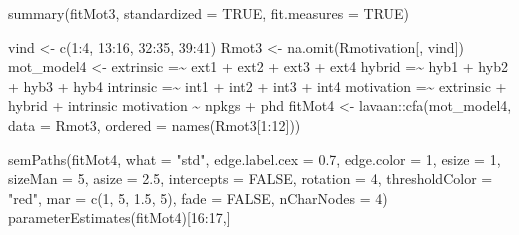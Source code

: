 \documentclass[
]{book}
\newenvironment{Shaded}{\begin{snugshade}}{\end{snugshade}}
\newcommand{\AttributeTok}[1]{\textcolor[rgb]{0.77,0.63,0.00}{#1}}
\newcommand{\ConstantTok}[1]{\textcolor[rgb]{0.00,0.00,0.00}{#1}}
\newcommand{\DecValTok}[1]{\textcolor[rgb]{0.00,0.00,0.81}{#1}}
\newcommand{\FloatTok}[1]{\textcolor[rgb]{0.00,0.00,0.81}{#1}}
\newcommand{\FunctionTok}[1]{\textcolor[rgb]{0.00,0.00,0.00}{#1}}
\newcommand{\NormalTok}[1]{#1}
\newcommand{\OtherTok}[1]{\textcolor[rgb]{0.56,0.35,0.01}{#1}}
\newcommand{\SpecialCharTok}[1]{\textcolor[rgb]{0.00,0.00,0.00}{#1}}
\newcommand{\StringTok}[1]{\textcolor[rgb]{0.31,0.60,0.02}{#1}}
\begin{document}
\begin{Shaded}
\begin{Highlighting}[]
\FunctionTok{summary}\NormalTok{(fitMot3, }\AttributeTok{standardized =} \ConstantTok{TRUE}\NormalTok{, }\AttributeTok{fit.measures =} \ConstantTok{TRUE}\NormalTok{)}

\NormalTok{vind }\OtherTok{\textless{}{-}} \FunctionTok{c}\NormalTok{(}\DecValTok{1}\SpecialCharTok{:}\DecValTok{4}\NormalTok{, }\DecValTok{13}\SpecialCharTok{:}\DecValTok{16}\NormalTok{, }\DecValTok{32}\SpecialCharTok{:}\DecValTok{35}\NormalTok{, }\DecValTok{39}\SpecialCharTok{:}\DecValTok{41}\NormalTok{)}
\NormalTok{Rmot3 }\OtherTok{\textless{}{-}} \FunctionTok{na.omit}\NormalTok{(Rmotivation[, vind])}
\NormalTok{mot\_model4 }\OtherTok{\textless{}{-}} \StringTok{\textquotesingle{}}
\StringTok{  extrinsic  =\textasciitilde{} ext1 + ext2 + ext3 + ext4 }
\StringTok{  hybrid =\textasciitilde{} hyb1 + hyb2 + hyb3 + hyb4              }
\StringTok{  intrinsic =\textasciitilde{}  int1 + int2 + int3 + int4 }
\StringTok{  motivation =\textasciitilde{} extrinsic + hybrid + intrinsic}
\StringTok{  motivation \textasciitilde{} npkgs + phd\textquotesingle{}}
\NormalTok{fitMot4 }\OtherTok{\textless{}{-}}\NormalTok{ lavaan}\SpecialCharTok{::}\FunctionTok{cfa}\NormalTok{(mot\_model4, }\AttributeTok{data =}\NormalTok{ Rmot3, }\AttributeTok{ordered =} \FunctionTok{names}\NormalTok{(Rmot3[}\DecValTok{1}\SpecialCharTok{:}\DecValTok{12}\NormalTok{]))}

\FunctionTok{semPaths}\NormalTok{(fitMot4, }\AttributeTok{what =} \StringTok{"std"}\NormalTok{, }\AttributeTok{edge.label.cex =} \FloatTok{0.7}\NormalTok{, }\AttributeTok{edge.color =} \DecValTok{1}\NormalTok{, }\AttributeTok{esize =} \DecValTok{1}\NormalTok{, }\AttributeTok{sizeMan =} \DecValTok{5}\NormalTok{, }\AttributeTok{asize =} \FloatTok{2.5}\NormalTok{,}
         \AttributeTok{intercepts =} \ConstantTok{FALSE}\NormalTok{, }\AttributeTok{rotation =} \DecValTok{4}\NormalTok{, }\AttributeTok{thresholdColor =} \StringTok{"red"}\NormalTok{, }\AttributeTok{mar =} \FunctionTok{c}\NormalTok{(}\DecValTok{1}\NormalTok{, }\DecValTok{5}\NormalTok{, }\FloatTok{1.5}\NormalTok{, }\DecValTok{5}\NormalTok{), }\AttributeTok{fade =} \ConstantTok{FALSE}\NormalTok{, }\AttributeTok{nCharNodes =} \DecValTok{4}\NormalTok{)}
\FunctionTok{parameterEstimates}\NormalTok{(fitMot4)[}\DecValTok{16}\SpecialCharTok{:}\DecValTok{17}\NormalTok{,]}


\end{Highlighting}
\end{Shaded}
\end{document}
